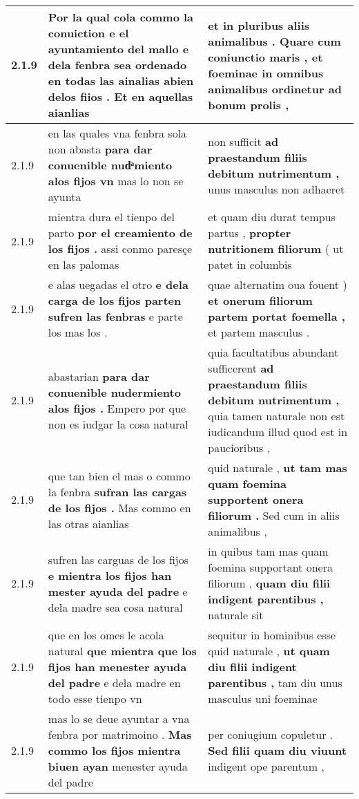 \begin{tabular}{|p{1cm}|p{6.5cm}|p{6.5cm}|}
2.1.9 & Por la qual cola commo la conuiction \textbf{ e el ayuntamiento del mallo e dela fenbra sea ordenado en todas las ainalias abien delos fiios . } Et en aquellas aianlias & et in pluribus aliis animalibus . \textbf{ Quare cum coniunctio maris , et foeminae in omnibus animalibus ordinetur } ad bonum prolis , \\\hline
2.1.9 & en las quales vna fenbra sola non abasta \textbf{ para dar conuenible nudͣmiento alos fijos vn } mas lo non se ayunta & non sufficit \textbf{ ad praestandum filiis debitum nutrimentum , } unus masculus non adhaeret \\\hline
2.1.9 & mientra dura el tienpo del parto \textbf{ por el creamiento de los fijos . } assi conmo paresçe en las palomas & et quam diu durat tempus partus , \textbf{ propter nutritionem filiorum } ( ut patet in columbis \\\hline
2.1.9 & e alas uegadas el otro \textbf{ e dela carga de los fijos parten sufren las fenbras } e parte los mas los . & quae alternatim oua fouent ) \textbf{ et onerum filiorum partem portat foemella , } et partem masculus . \\\hline
2.1.9 & abastarian \textbf{ para dar conuenible nudermiento alos fijos . } Empero por que non es iudgar la cosa natural & quia facultatibus abundant sufficerent \textbf{ ad praestandum filiis debitum nutrimentum , } quia tamen naturale non est iudicandum illud quod est in paucioribus , \\\hline
2.1.9 & que tan bien el mas o commo la fenbra \textbf{ sufran las cargas de los fijos . } Mas commo en las otras aianlias & quid naturale , \textbf{ ut tam mas quam foemina supportent onera filiorum . } Sed cum in aliis animalibus , \\\hline
2.1.9 & sufren las carguas de los fijos \textbf{ e mientra los fijos han mester ayuda del padre } e dela madre sea cosa natural & in quibus tam mas quam foemina supportant onera filiorum , \textbf{ quam diu filii indigent parentibus , } naturale sit \\\hline
2.1.9 & que en los omes le acola natural \textbf{ que mientra que los fijos han menester ayuda del padre } e dela madre en todo esse tienpo vn & sequitur in hominibus esse quid naturale , \textbf{ ut quam diu filii indigent parentibus , } tam diu unus masculus uni foeminae \\\hline
2.1.9 & mas lo se deue ayuntar a vna fenbra por matrimoino . \textbf{ Mas commo los fijos mientra biuen ayan } menester ayuda del padre & per coniugium copuletur . \textbf{ Sed filii quam diu viuunt } indigent ope parentum , \\\hline

\end{tabular}
